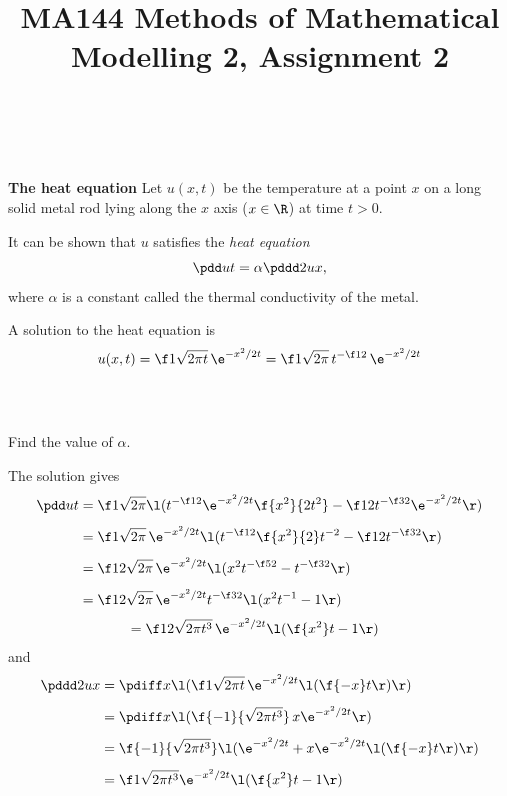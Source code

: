 \documentclass[a4paper]{article}
\title{MA144 Methods of Mathematical Modelling 2, Assignment 2}
\begin{document}
\maketitle

\setlength{\parindent}{0em}
\setlength{\parskip}{1em}


\subsection{~} %

\begin{questionbody}
\textbf{The heat equation} \quad
Let $u(x, t)$ be the temperature at a point $x$ on a long solid metal rod lying along the $x$ axis ($x \in \R$) at time $t > 0$.

It can be shown that $u$ satisfies the \textit{heat equation} \[
\pdd ut = \alpha \pddd 2ux,
\] where $\alpha$ is a constant called the thermal conductivity of the metal.

A solution to the heat equation is \[
u(x, t) = \f1{\sqrt{2 \pi t}}\, \e^{- x^2 / 2t} = \f1{\sqrt{2\pi}}\, t^{-\f12}\, \e^{- x^2 / 2t}
\]
\end{questionbody}

\subsubsection{~} %

\begin{questionbody}
Find the value of $\alpha$.
\end{questionbody}

The solution gives \begin{align*}
\pdd ut &= \f1{\sqrt{2\pi}} \l( t^{-\f12} \e^{-x^2 / 2t} \f{x^2}{2t^2} - \f12 t^{-\f32} \e^{-x^2 / 2t} \r)\\[1ex]
&= \f1{\sqrt{2\pi}}\, \e^{-x^2 / 2t} \l( t^{-\f12} \f{x^2}{2} t^{-2} - \f12 t^{-\f32} \r)\\[1ex]
&= \f1{2\sqrt{2\pi}}\, \e^{-x^2 / 2t} \l( x^2 t^{-\f52} - t^{-\f32} \r)\\[1ex]
&= \f1{2\sqrt{2\pi}}\, \e^{-x^2 / 2t} t^{-\f32} \l( x^2 t^{-1} - 1 \r)
\end{align*}
\begin{align*}
&= \f1{2\sqrt{2\pi t^3}}\, \e^{-x^2 / 2t} \l( \f{x^2}t - 1 \r)
\end{align*}
and \begin{align*}
\pddd 2ux &= \pdiff x \l( \f1{\sqrt{2\pi t}}\, \e^{-x^2 / 2t} \l( \f{-x}t \r) \r)\\[1ex]
&= \pdiff x \l( \f{-1}{\sqrt{2\pi t^3}}\, x \e^{-x^2 / 2t} \r)\\[1ex]
&= \f{-1}{\sqrt{2\pi t^3}} \l( \e^{-x^2 / 2t} + x \e^{-x^2 / 2t} \l(\f{-x}t\r) \r)\\[1ex]
&= \f1{\sqrt{2\pi t^3}} \e^{-x^2 / 2t} \l( \f{x^2}t - 1 \r)
\end{align*}
\end{document}
